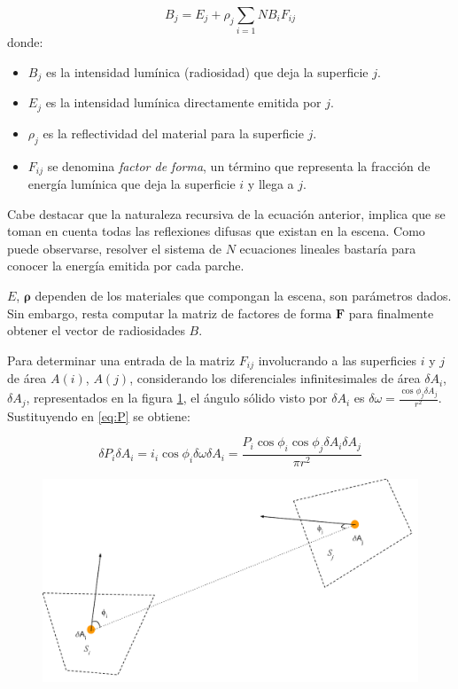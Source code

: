 \begin{equation}
    B_{j} = E_{j} + \rho_{j} \sum_{i=1}{N} B_{i} F_{ij} \label{eq:radiosity}
\end{equation}
donde:
\begin{itemize}
    \item $B_{j}$ es la intensidad lumínica (radiosidad) que deja la superficie $j$.
    \item $E_{j}$ es la intensidad lumínica directamente emitida por $j$.
    \item $\rho_{j}$ es la reflectividad del material para la superficie $j$.
    \item $F_{ij}$ se denomina \textit{factor de forma}, un término que representa la fracción de energía lumínica
    que deja la superficie $i$ y llega a $j$. 
\end{itemize}

Cabe destacar que la naturaleza recursiva de la ecuación anterior, implica que se toman en cuenta todas las reflexiones difusas que existan en la escena. Como puede observarse, resolver el sistema de $N$ ecuaciones lineales bastaría para conocer la energía emitida por cada parche. 

$E$, $\mathbf{\rho}$ dependen de los materiales que compongan la escena, son parámetros dados. Sin embargo, resta computar la matriz de factores de forma $\mathbf{F}$ para finalmente obtener el vector de radiosidades $B$. 

Para determinar una entrada de la matriz $F_{ij}$ involucrando a las superficies $i$ y $j$ de área $A(i)$, $A(j)$, considerando los diferenciales infinitesimales de área $\delta{A_{i}}$, $\delta{A_{j}}$, representados en la figura \ref{img:ff}, el ángulo sólido visto por $\delta{A_{i}}$ es $\delta{\omega} = \frac{\cos{\phi_{j}\delta{A_{j}}}}{r^{2}}$. Sustituyendo en \eqref{eq:P} se obtiene:

\begin{equation}
    \delta{P}_{i}\delta{A_{i}} = i_{i} \cos{\phi_{i}}\delta{\omega}\delta{A_{i}} = \frac{P_{i}\cos{\phi_{i}}\cos{\phi_{j}}\delta{A_{i}}\delta{A_{j}}}{\pi r^{2}}
\end{equation}

\vspace{5mm}
\begin{figure}[h]
	\centering
	\includegraphics[width=0.8\linewidth]{assets/ff}
	\label{img:ff}
\end{figure}


